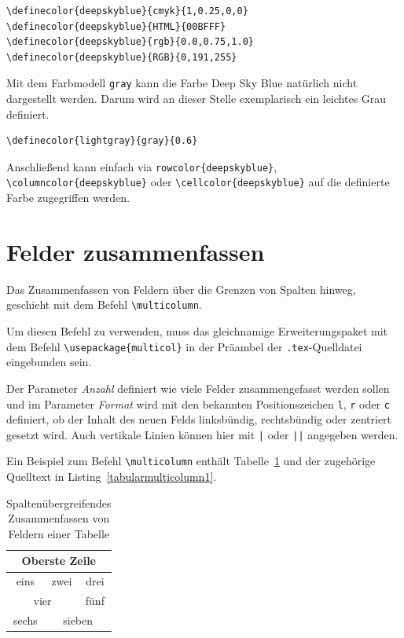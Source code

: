 \documentclass[a4paper,10pt,twoside]{scrbook}
\begin{document}
{\begin{Verbatim}[frame=single]
\definecolor{deepskyblue}{cmyk}{1,0.25,0,0}
\definecolor{deepskyblue}{HTML}{00BFFF}
\definecolor{deepskyblue}{rgb}{0.0,0.75,1.0}
\definecolor{deepskyblue}{RGB}{0,191,255}
\end{Verbatim}



Mit dem Farbmodell \verb!gray! kann die Farbe Deep Sky Blue natürlich nicht dargestellt werden. Darum wird an dieser Stelle exemplarisch ein leichtes Grau definiert.

\begin{Verbatim}[frame=single]
\definecolor{lightgray}{gray}{0.6}
\end{Verbatim}

Anschließend kann einfach via \verb!rowcolor{deepskyblue}!, \verb!\columncolor{deepskyblue}! oder \verb!\cellcolor{deepskyblue}! auf die definierte Farbe zugegriffen werden.



\section{Felder zusammenfassen}

Das Zusammenfassen von Feldern über die Grenzen von Spalten hinweg, geschieht mit dem Befehl \verb!\multicolumn!. 


Um diesen Befehl zu verwenden, muss das gleichnamige Erweiterungspaket mit dem Befehl \verb!\usepackage{multicol}! in der Präambel der \verb!.tex!-Quelldatei eingebunden sein.

Der Parameter \textsl{Anzahl} definiert wie viele Felder zusammengefasst werden sollen und im Parameter \textsl{Format} wird mit den bekannten Positionszeichen \verb!l!, \verb!r! oder \verb!c! definiert, ob der Inhalt des neuen Felds linksbündig, rechtsbündig oder zentriert gesetzt wird. Auch vertikale Linien können hier mit \verb!|! oder \verb!||! angegeben werden.

Ein Beispiel zum Befehl \verb!\multicolumn! enthält Tabelle~\ref{Tabelle_Multicolumn1} und der zugehörige Quelltext in Listing~\ref{tabularmulticolumn1}.


\begin{table}[h!tb]
\centering
\caption{Spaltenübergreifendes Zusammenfassen von Feldern einer Tabelle}
\label{Tabelle_Multicolumn1}
\begin{tabular}{|c|c|c|}
\hline
\multicolumn{3}{|c|}{Oberste Zeile} \\
\hline\hline
eins & zwei & drei \\
\hline
\multicolumn{2}{|c|}{vier} & fünf \\
\hline
sechs & \multicolumn{2}{c|}{sieben} \\
\hline
\end{tabular}
\end{table}


}
\end{document}
